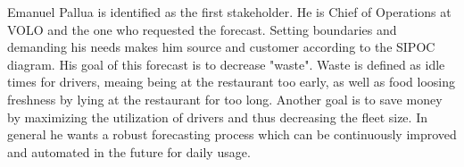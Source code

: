 \begin{table}[h]
\centering
\caption{SIPOC Diagram derived from the five basic steps}
\label{tab:sipoc}
\end{table}
Emanuel Pallua is identified as the first stakeholder. He is Chief of Operations at VOLO and the one who requested the forecast. Setting boundaries and demanding his needs makes him source and customer according to the SIPOC diagram. His goal of this forecast is to decrease "waste". Waste is defined as idle times for drivers, meaing being at the restaurant too early, as well as food loosing freshness by lying at the restaurant for too long. Another goal is to save money by maximizing the utilization of drivers and thus decreasing the fleet size. In general he wants a robust forecasting process which can be continuously improved and automated in the future for daily usage. \newline
